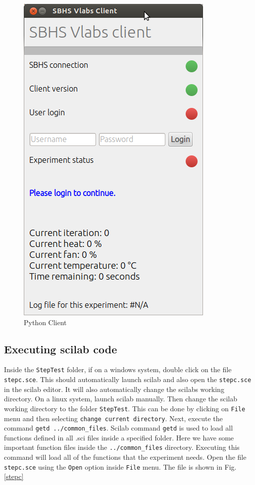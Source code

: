 \begin{figure}
\centering
\includegraphics[width=0.5\linewidth]{vlabs/python-client.png}
\caption{Python Client}
\label{python-client}
\end{figure}


\subsection{Executing scilab code}
Inside the {\tt StepTest} folder, if on a windows system, double click on the  file {\tt stepc.sce}. This should automatically launch scilab and also open the {\tt stepc.sce} in the scilab editor. It will also automatically change the scilabs working directory. On a linux system, launch scilab manually. Then change the scilab working directory to the folder {\tt StepTest}. This can be done by clicking on {\tt File} menu and then selecting {\tt change current directory}. Next, execute the command {\tt getd ..\slash common\_files}. Scilab command {\tt getd} is used to load all functions defined in all .sci files inside a specified folder. Here we have some important function files inside the {\tt ..\slash common\_files} directory. Executing this command will load all of the functions that the experiment needs. Open the file {\tt stepc.sce} using the {\tt Open} option inside {\tt File} menu. The file is shown in Fig. \ref{stepc}

